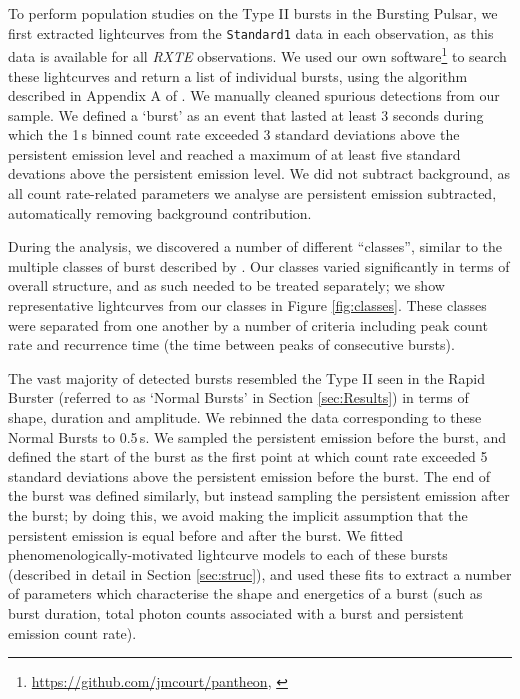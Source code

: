 \par To perform population studies on the Type II bursts in the Bursting Pulsar, we first extracted lightcurves from the \texttt{Standard1} data in each observation, as this data is available for all \textit{RXTE} observations.  We used our own software\footnote{\url{https://github.com/jmcourt/pantheon}, \citep{Court_PANTHEON}} to search these lightcurves and return a list of individual bursts, using the algorithm described in Appendix A of \citet{Court_IGRClasses}.  We manually cleaned spurious detections from our sample.  We defined a `burst' as an event that lasted at least 3 seconds during which the 1\,s binned count rate exceeded 3 standard deviations above the persistent emission level and reached a maximum of at least five standard devations above the persistent emission level.  We did not subtract background, as all count rate-related parameters we analyse are persistent emission subtracted, automatically removing background contribution.
\par During the analysis, we discovered a number of different ``classes'', similar to the multiple classes of burst described by \citet{Giles_BP}.  Our classes varied significantly in terms of overall structure, and as such needed to be treated separately; we show representative lightcurves from our classes in Figure \ref{fig:classes}.  These classes were separated from one another by a number of criteria including peak count rate and recurrence time (the time between peaks of consecutive bursts).
\par The vast majority of detected bursts resembled the Type II seen in the Rapid Burster (referred to as `Normal Bursts' in Section \ref{sec:Results}) in terms of shape, duration and amplitude.  We rebinned the data corresponding to these Normal Bursts to 0.5\,s.  We sampled the persistent emission before the burst, and defined the start of the burst as the first point at which count rate exceeded 5 standard deviations above the persistent emission before the burst.  The end of the burst was defined similarly, but instead sampling the persistent emission after the burst; by doing this, we avoid making the implicit assumption that the persistent emission is equal before and after the burst.  We fitted phenomenologically-motivated lightcurve models to each of these bursts (described in detail in Section \ref{sec:struc}), and used these fits to extract a number of parameters which characterise the shape and energetics of a burst (such as burst duration, total photon counts associated with a burst and persistent emission count rate).
